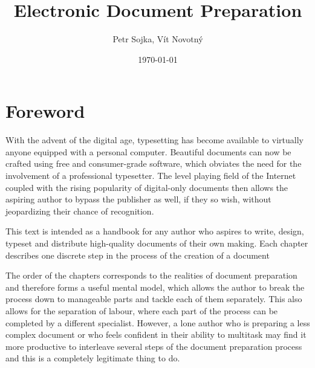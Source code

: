 \documentclass{book}
\title{Electronic Document Preparation}
\author{Petr Sojka, Vít Novotný}
\date{\today}
\begin{document}
  \frontmatter
    \maketitle
    \tableofcontents
  \mainmatter
    \chapter{Foreword}
      With the advent of the digital age, typesetting has become available to
      virtually anyone equipped with a personal computer. Beautiful documents
      can now be crafted using free and consumer-grade software, which obviates
      the need for the involvement of a professional typesetter. The level
      playing field of the Internet coupled with the rising popularity of
      digital-only documents then allows the aspiring author to bypass the
      publisher as well, if they so wish, without jeopardizing their chance of
      recognition.
      
      This text is intended as a handbook for any author who aspires to write,
      design, typeset and distribute high-quality documents of their own making.
      Each chapter describes one discrete step in the process of the creation of
      a document %

      The order of the chapters corresponds to the realities of document
      preparation and therefore forms a useful mental model, which allows the
      author to break the process down to manageable parts and tackle each of
      them separately. This also allows for the separation of labour, where
      each part of the process can be completed by a different specialist.
      However, a lone author who is preparing a less complex document or who
      feels confident in their ability to multitask may find it more productive
      to interleave several steps of the document preparation process and this
      is a completely legitimate thing to do.
\end{document}
